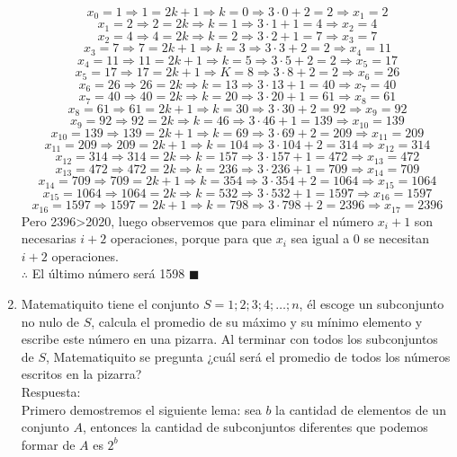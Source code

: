\documentclass{book}
\begin{document}
\begin{enumerate}
        $$x_0=1\Rightarrow 1=2k+1\Rightarrow k=0\Rightarrow 3\cdot 0+2=2\Rightarrow x_1=2$$
        $$x_1=2\Rightarrow 2=2k\Rightarrow k=1\Rightarrow 3\cdot 1+1=4\Rightarrow x_2=4$$
        $$x_2=4\Rightarrow 4=2k\Rightarrow k=2\Rightarrow 3\cdot 2+1=7\Rightarrow x_3=7$$
        $$x_3=7\Rightarrow 7=2k+1\Rightarrow k=3\Rightarrow 3\cdot 3+2=2\Rightarrow x_4=11$$
        $$x_4=11\Rightarrow 11=2k+1\Rightarrow k=5\Rightarrow 3\cdot 5+2=2\Rightarrow x_5=17$$
        $$x_5=17\Rightarrow 17=2k+1\Rightarrow K=8\Rightarrow 3\cdot 8+2=2\Rightarrow x_6=26$$
        $$x_6=26\Rightarrow 26=2k\Rightarrow k=13\Rightarrow 3\cdot 13+1=40\Rightarrow x_7=40$$
        $$x_7=40\Rightarrow 40=2k\Rightarrow k=20\Rightarrow 3\cdot 20+1=61\Rightarrow x_8=61$$
        $$x_8=61\Rightarrow 61=2k+1\Rightarrow k=30\Rightarrow 3\cdot 30+2=92\Rightarrow x_9=92$$
        $$x_9=92\Rightarrow 92=2k\Rightarrow k=46\Rightarrow 3\cdot 46+1=139\Rightarrow x_10=139$$
        $$x_{10}=139\Rightarrow 139=2k+1\Rightarrow k=69\Rightarrow 3\cdot 69+2=209\Rightarrow x_{11}=209$$
        $$x_{11}=209\Rightarrow 209=2k+1\Rightarrow k=104\Rightarrow 3\cdot 104+2=314\Rightarrow x_{12}=314$$
        $$x_{12}=314\Rightarrow 314=2k\Rightarrow k=157\Rightarrow 3\cdot 157+1=472\Rightarrow x_{13}=472$$
        $$x_{13}=472\Rightarrow 472=2k\Rightarrow k=236\Rightarrow 3\cdot 236+1=709\Rightarrow x_{14}=709$$
        $$x_{14}=709\Rightarrow 709=2k+1\Rightarrow k=354\Rightarrow 3\cdot 354+2=1064\Rightarrow x_{15}=1064$$
        $$x_{15}=1064\Rightarrow 1064=2k\Rightarrow k=532\Rightarrow 3\cdot 532+1=1597\Rightarrow x_{16}=1597$$
        $$x_{16}=1597\Rightarrow 1597=2k+1\Rightarrow k=798\Rightarrow 3\cdot 798+2=2396\Rightarrow x_{17}=2396$$
        Pero 2396>2020, luego observemos que para eliminar el número $x_i+1$ son necesarias $i+2$ operaciones, porque para que $x_i$ sea igual a 0 se necesitan $i+2$ operaciones. \\
        $\therefore$ El último número será 1598 $\blacksquare$\\
        \item Matematiquito tiene el conjunto $S={1;2;3;4;\ldots ;n}$, él escoge un subconjunto no nulo de $S$, calcula el promedio de su máximo y su mínimo elemento y escribe este número en una pizarra. Al terminar con todos los subconjuntos de $S$, Matematiquito se pregunta ¿cuál será el promedio de todos los números escritos en la pizarra?\\
        Respuesta:\\
        Primero demostremos el siguiente lema: sea $b$ la cantidad de elementos de un conjunto $A$, entonces la cantidad de subconjuntos diferentes que podemos formar de $A$ es $2^b$\\

\end{enumerate}
\end{document}

